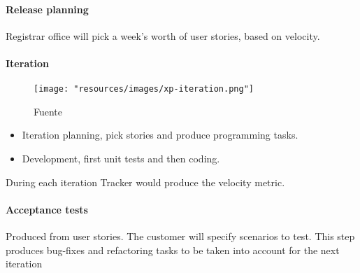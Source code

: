 \paragraph{Release planning} Registrar office will pick a week's worth of user stories, based on velocity.

\paragraph{Iteration}

\begin{figure}
    \texttt{[image: "resources/images/xp-iteration.png"]}
    \caption{Fuente \textcite{XpWeb}}\label{fig:xp-iteration}
\end{figure}

\begin{itemize}
    \item Iteration planning, pick stories and produce programming tasks.
    \item Development, first unit tests and then coding.
\end{itemize}

During each iteration Tracker would produce the velocity metric.

\paragraph{Acceptance tests} Produced from user stories.
The customer will specify scenarios to test. This step produces bug-fixes and refactoring tasks to be taken into account for the next iteration
